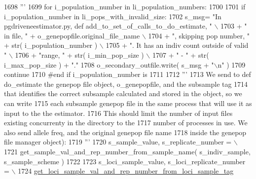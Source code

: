 \begin{DoxyCode}
1698 \textcolor{stringliteral}{            '''}
1699             \textcolor{keywordflow}{for} i\_population\_number \textcolor{keywordflow}{in} li\_population\_numbers:
1700 
1701                 \textcolor{keywordflow}{if} i\_population\_number \textcolor{keywordflow}{in} li\_pops\_with\_invalid\_size:
1702                     s\_msg= \textcolor{stringliteral}{"In pgdriveneestimator.py, def add\_to\_set\_of\_calls\_to\_do\_estimate, "} \(\backslash\)
1703                                     + \textcolor{stringliteral}{" in file, "} + o\_genepopfile.original\_file\_name \(\backslash\)
1704                                     + \textcolor{stringliteral}{", skipping pop number, "}  + str( i\_population\_number ) \(\backslash\)
1705                                     + \textcolor{stringliteral}{".  It has an indiv count outside of valid "} \(\backslash\)
1706                                     + \textcolor{stringliteral}{"range, "} + str( i\_min\_pop\_size ) \(\backslash\)
1707                                     + \textcolor{stringliteral}{" - "} + str( i\_max\_pop\_size ) + \textcolor{stringliteral}{"."}
1708                     o\_secondary\_outfile.write( s\_msg + \textcolor{stringliteral}{"\(\backslash\)n"} )
1709                     \textcolor{keywordflow}{continue}
1710                 \textcolor{comment}{#end if i\_population\_number is}
1711 
1712                 \textcolor{stringliteral}{'''}
1713 \textcolor{stringliteral}{                We send to def do\_estimate the genepop file object, o\_genepopfile, and the subsample tag}
1714 \textcolor{stringliteral}{                that identifies the correct subsample calculated and stored in the object, so we can write}
1715 \textcolor{stringliteral}{                each subsample genepop file in the same process that will use it as input to the the
       estimator.}
1716 \textcolor{stringliteral}{                This should limit the number of input files existing concurrenty in the directory to the }
1717 \textcolor{stringliteral}{                number of processes in use.  We also send allele freq, and the original genepop file name }
1718 \textcolor{stringliteral}{                inside the genepop file manager object):}
1719 \textcolor{stringliteral}{                '''}
1720                 s\_sample\_value, s\_replicate\_number = \(\backslash\)
1721                         get\_sample\_val\_and\_rep\_number\_from\_sample\_name( s\_indiv\_sample, s\_sample\_scheme )
1722 
1723                 s\_loci\_sample\_value, s\_loci\_replicate\_number = \(\backslash\)
1724                         \hyperlink{namespacenegui_1_1pgdriveneestimator_abd853ec3bf6e5ad25f39ba0b41302f14}{get\_loci\_sample\_val\_and\_rep\_number\_from\_loci\_sample\_tag}

\end{DoxyCode}
